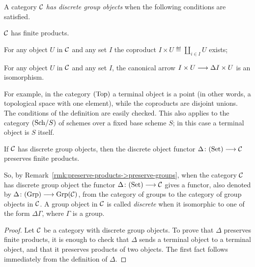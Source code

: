 \begin{2   CONTRAVARIANT FUNCTORS}
\begin{2.2 Group objects}
\begin{definition}
A category $\mathcal{C}$ \emph{has discrete group objects} when the following conditions are satisfied.

\begin{enumeratei}

 $\mathcal{C}$ has finite products.

  For any object $U$ in $\mathcal{C}$ and any set $I$ the coproduct $I \times U \eqdef \coprod_{i \in I} U$ exists;

 For any object $U$ in $\mathcal{C}$ and any set $I$, the canonical arrow $I \times U \arr \Delta I \times U$ is an isomorphism.
\end{enumeratei}

\end{definition}

For example, in the category $(\mathrm{Top})$ a terminal object is a point (in other words, a topological space with one element), while the coproducts are disjoint unions. The conditions of the definition are easily checked. This also applies to the category $({\mathrm{Sch}/S})$ of schemes over a fixed base scheme $S$; in this case a terminal object is $S$ itself.


\begin{proposition}\label{prop:has-discrete-groups}
If $\mathcal{C}$ has discrete group objects, then the discrete object functor $\Delta \colon \catset \arr \cC$ preserves finite products.
\end{proposition}


So, by Remark~\ref{rmk:preserve-products->preserve-groups}, when the category $\mathcal{C}$ has discrete group object the functor $\Delta \colon \catset \arr \cC$ gives a functor, also denoted by $\Delta \colon \catgrp \arr \catgrpover{\cC}$, from the category of groups to the category of group objects in $\mathcal{C}$. A group object in $\mathcal{C}$ is called \emph{discrete} when it isomorphic to one of the form $\Delta\Gamma$, where $\Gamma$ is a group.

\begin{proof}

Let $\mathcal{C}$ be a category with discrete group objects. To prove that $\Delta$ preserves finite products, it is enough to check that $\Delta$ sends a terminal object to a terminal object, and that it preserves products of two objects. The  first fact follows  immediately from the definition of $\Delta$.


\end{proof}
\end{2.2 Group objects}
\end{2   CONTRAVARIANT FUNCTORS}
